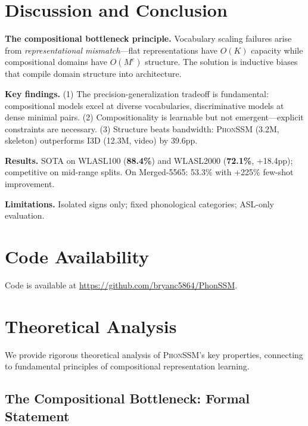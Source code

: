 \documentclass{article}
\theoremstyle{definition}
\theoremstyle{remark}
\newcommand{\phonssm}{\textsc{PhonSSM}}
\begin{document}
\section{Discussion and Conclusion}

\textbf{The compositional bottleneck principle.} Vocabulary scaling failures arise from \textit{representational mismatch}---flat representations have $O(K)$ capacity while compositional domains have $O(M^c)$ structure. The solution is inductive biases that compile domain structure into architecture.

\textbf{Key findings.} (1) The precision-generalization tradeoff is fundamental: compositional models excel at diverse vocabularies, discriminative models at dense minimal pairs. (2) Compositionality is learnable but not emergent---explicit constraints are necessary. (3) Structure beats bandwidth: \phonssm{} (3.2M, skeleton) outperforms I3D (12.3M, video) by 39.6pp.

\textbf{Results.} SOTA on WLASL100 (\textbf{88.4\%}) and WLASL2000 (\textbf{72.1\%}, +18.4pp); competitive on mid-range splits. On Merged-5565: 53.3\% with +225\% few-shot improvement.

\textbf{Limitations.} Isolated signs only; fixed phonological categories; ASL-only evaluation.




\newpage
\appendix
\section{Code Availability}
Code is available at \url{https://github.com/bryanc5864/PhonSSM}.

\section{Theoretical Analysis}
\label{app:theory}

We provide rigorous theoretical analysis of \phonssm{}'s key properties, connecting to fundamental principles of compositional representation learning.

\subsection{The Compositional Bottleneck: Formal Statement}
\end{document}
